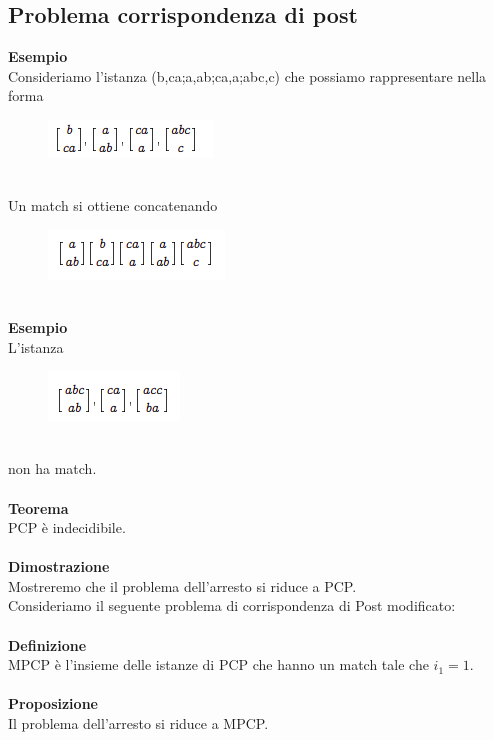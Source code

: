 \subsection{Problema corrispondenza di post}
\textbf{Esempio}\\
Consideriamo l’istanza (b,ca;a,ab;ca,a;abc,c) che possiamo rappresentare nella forma
\begin{figure}[htp]
    \centering
    \includegraphics[scale=0.8]{tesi_stile/img/cap7f1.png}
\end{figure}\\
Un match si ottiene concatenando
\begin{figure}[htp]
    \centering
    \includegraphics[scale=0.8]{tesi_stile/img/cap7f2.png}
\end{figure}\\
\textbf{Esempio}\\
L’istanza\\
\begin{figure}[htp]
    \centering
    \includegraphics[scale=0.8]{tesi_stile/img/cap7f3.png}
\end{figure}\\
non ha match.\\\\
\textbf{Teorema}\\
PCP è indecidibile.\\\\
\textbf{Dimostrazione}\\
Mostreremo che il problema dell’arresto si riduce a PCP.\\
Consideriamo il seguente problema di corrispondenza di Post modificato:\\\\
\textbf{Definizione}\\
MPCP è l’insieme delle istanze di PCP che hanno un match tale che $i_1 = 1$.\\\\
\textbf{Proposizione}\\
Il problema dell’arresto si riduce a MPCP.
